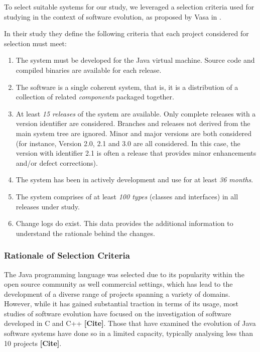 To select suitable systems for our study, we leveraged a selection criteria used for studying \OSYS in the context of software evolution, as proposed by Vasa in \cite{Vasa10a}.

In their study they define the following criteria that each project considered for selection must meet:

\begin{enumerate}
	\item The system must be developed for the Java virtual machine. Source code and compiled binaries are available for each release.
	\item The software is a single coherent system, that is, it is a distribution of a collection of related {\em components} packaged together.
	\item At least {\em 15 releases} of the system are available. Only complete releases with a version identifier are considered. Branches and releases not derived from the main system tree are ignored.  Minor and major versions are both considered (for instance, Version 2.0, 2.1 and 3.0 are all considered. In this case, the version with identifier 2.1 is often a release that provides minor enhancements and/or defect corrections).
	\item The system has been in actively development and use for at least \emph{36 months}.
	\item The system comprises of at least \emph{100 types} (\ie classes and interfaces) in all releases under study.
	\item Change logs do exist. This data provides the additional information to understand the rationale behind the changes.
\end{enumerate}

\subsubsection{Rationale of Selection Criteria} %
\label{ssub:rationale_of_selection_criteria}

The Java programming language was selected due to its popularity within the open source community as well commercial settings, which has lead to the development of a diverse range of projects spanning a variety of domains. However, while it has gained substantial traction in terms of its usage, most studies of software evolution have focused on the investigation of software developed in C and C++ \textbf{[Cite]}. Those that have examined the evolution of Java software systems have done so in a limited capacity, typically analysing less than 10 projects \textbf{[Cite]}.

